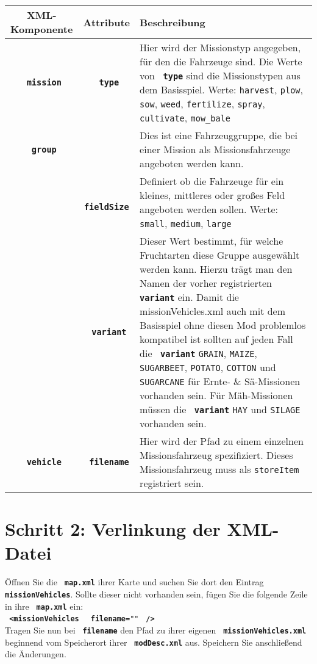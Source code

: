 \documentclass[a4paper]{scrartcl}
\newcommand{\XML}[1]{\texttt{\textbf{\color{pblue} #1}}}
\newcommand{\Attr}[1]{\texttt{\textbf{\color{pgreen} #1}}}
\newcommand{\Datei}[1]{\texttt{\textbf{\color{datei} #1}}}
\newcommand{\icon}[1]{
	\hspace{-2mm}
	\faIcon[solid]{#1}
	\hspace{-2mm}
}
\newcommand{\warning}{{\color{pred}\icon{exclamation-triangle}}}
\begin{document}
		\begin{tabular}{c|c|p{9cm}}
			\textbf{XML-Komponente} & \textbf{Attribute} & \textbf{Beschreibung}\\
			\hline
			\XML{mission} & \Attr{type} &
			Hier wird der Missionstyp angegeben, für den die Fahrzeuge sind. Die Werte von \Attr{type} sind die Missionstypen aus dem Basisspiel.\newline
			Werte: \texttt{harvest}, \texttt{plow}, \texttt{sow}, \texttt{weed}, \texttt{fertilize}, \texttt{spray}, \texttt{cultivate}, \texttt{mow\_bale}\\
			\hline
			\XML{group} & & Dies ist eine Fahrzeuggruppe, die bei einer Mission als Missionsfahrzeuge angeboten werden kann.\\
			\hdashline
			& \Attr{fieldSize} & Definiert ob die Fahrzeuge für ein kleines, mittleres oder großes Feld angeboten werden sollen.\newline
			Werte: \texttt{small}, \texttt{medium}, \texttt{large}\\
			\hdashline
			& \Attr{variant} & Dieser Wert bestimmt, für welche Fruchtarten diese Gruppe ausgewählt werden kann. Hierzu trägt man den Namen der vorher registrierten \XML{variant} ein.\newline
			\warning Damit die missionVehicles.xml auch mit dem Basisspiel ohne diesen Mod problemlos kompatibel ist sollten auf jeden Fall die \XML{variant} \texttt{GRAIN}, \texttt{MAIZE}, \texttt{SUGARBEET}, \texttt{POTATO}, \texttt{COTTON} und \texttt{SUGARCANE} für Ernte- \& Sä-Missionen vorhanden sein.\newline
			\warning Für Mäh-Missionen müssen die \XML{variant} \texttt{HAY} und \texttt{SILAGE} vorhanden sein.\\
			\hline
			\XML{vehicle} & \Attr{filename} & Hier wird der Pfad zu einem einzelnen Missionsfahrzeug spezifiziert. Dieses  Missionsfahrzeug muss als \texttt{storeItem} registriert sein.
		\end{tabular}

	\section*{Schritt 2: Verlinkung der XML-Datei}
		Öffnen Sie die \Datei{map.xml} ihrer Karte und suchen Sie dort den Eintrag \XML{missionVehicles}. Sollte dieser nicht vorhanden sein, fügen Sie die folgende Zeile in ihre \Datei{map.xml} ein:\\
		\XML{<missionVehicles } \Attr{filename}\texttt{="}\texttt{"} \XML{/>}\\
		Tragen Sie nun bei \Attr{filename} den Pfad zu ihrer eigenen \Datei{missionVehicles.xml} beginnend vom Speicherort ihrer \Datei{modDesc.xml} aus. Speichern Sie anschließend die Änderungen.
	\newpage
\end{document}
